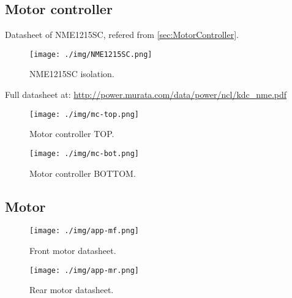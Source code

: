 \newcommand{\insertOnce}[1]{
	\ifundef{\once}{#1 \global\def\once{}}{}
}

\newcommand{\insertOnceReset}{
	\global\undef{\once}	
}

\newcommand{\addDsh}[5]{
		
	\insertOnceReset
}





\subsection{Motor controller}

Datasheet of NME1215SC, refered from \ref{sec:MotorController}.
\begin{figure}[H]
	\centering
	\texttt{[image: ./img/NME1215SC.png]}
	\caption{NME1215SC isolation.}
	\label{app:NME1215SC}
\end{figure}
Full datasheet at: \url{http://power.murata.com/data/power/ncl/kdc_nme.pdf}

\begin{figure}[H]
	\centering
	\texttt{[image: ./img/mc-top.png]}
	\caption{Motor controller TOP.}
	\label{app:mc-top}
\end{figure}

\begin{figure}[H]
	\centering
	\texttt{[image: ./img/mc-bot.png]}
	\caption{Motor controller BOTTOM.}
	\label{app:mc-bot}
\end{figure}

\subsection{Motor}

\begin{figure}[H]
	\centering
	\texttt{[image: ./img/app-mf.png]}
	\caption{Front motor datasheet.}
	\label{app:mf}
\end{figure}

\begin{figure}[H]
	\centering
	\texttt{[image: ./img/app-mr.png]}
	\caption{Rear motor datasheet.}
	\label{app:mr}
\end{figure}

